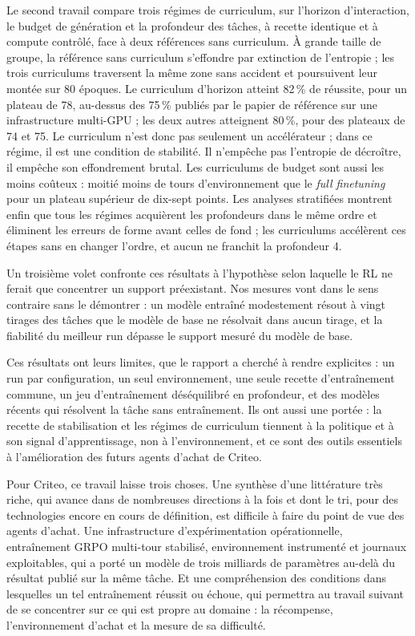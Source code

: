 \documentclass[11pt,a4paper]{article}
\begin{document}
Le second travail compare trois régimes de curriculum, sur l'horizon d'interaction, le budget de génération et la profondeur des tâches, à recette identique et à compute contrôlé, face à deux références sans curriculum. À grande taille de groupe, la référence sans curriculum s'effondre par extinction de l'entropie ; les trois curriculums traversent la même zone sans accident et poursuivent leur montée sur 80 époques. Le curriculum d'horizon atteint 82\,\% de réussite, pour un plateau de 78, au-dessus des 75\,\% publiés par le papier de référence sur une infrastructure multi-GPU ; les deux autres atteignent 80\,\%, pour des plateaux de 74 et 75. Le curriculum n'est donc pas seulement un accélérateur ; dans ce régime, il est une condition de stabilité. Il n'empêche pas l'entropie de décroître, il empêche son effondrement brutal. Les curriculums de budget sont aussi les moins coûteux : moitié moins de tours d'environnement que le \emph{full finetuning} pour un plateau supérieur de dix-sept points. Les analyses stratifiées montrent enfin que tous les régimes acquièrent les profondeurs dans le même ordre et éliminent les erreurs de forme avant celles de fond ; les curriculums accélèrent ces étapes sans en changer l'ordre, et aucun ne franchit la profondeur 4.

Un troisième volet confronte ces résultats à l'hypothèse selon laquelle le RL ne ferait que concentrer un support préexistant. Nos mesures vont dans le sens contraire sans le démontrer : un modèle entraîné modestement résout à vingt tirages des tâches que le modèle de base ne résolvait dans aucun tirage, et la fiabilité du meilleur run dépasse le support mesuré du modèle de base. 

Ces résultats ont leurs limites, que le rapport a cherché à rendre explicites : un run par configuration, un seul environnement, une seule recette d'entraînement commune, un jeu d'entraînement déséquilibré en profondeur, et des modèles récents qui résolvent la tâche sans entraînement. Ils ont aussi une portée : la recette de stabilisation et les régimes de curriculum tiennent à la politique et à son signal d'apprentissage, non à l'environnement, et ce sont des outils essentiels à l'amélioration des futurs agents d'achat de Criteo.

Pour Criteo, ce travail laisse trois choses. Une synthèse d'une littérature très riche, qui avance dans de nombreuses directions à la fois et dont le tri, pour des technologies encore en cours de définition, est difficile à faire du point de vue des agents d'achat. Une infrastructure d'expérimentation opérationnelle, entraînement GRPO multi-tour stabilisé, environnement instrumenté et journaux exploitables, qui a porté un modèle de trois milliards de paramètres au-delà du résultat publié sur la même tâche. Et une compréhension des conditions dans lesquelles un tel entraînement réussit ou échoue, qui permettra au travail suivant de se concentrer sur ce qui est propre au domaine : la récompense, l'environnement d'achat et la mesure de sa difficulté.
\end{document}
